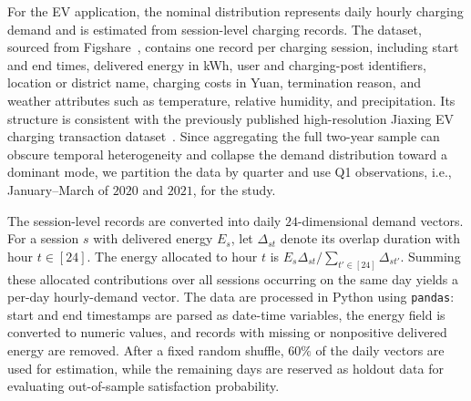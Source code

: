 \documentclass[opre,sglanonrev]{informs4}
\newcommand{\bw}{\bm{w}}
\begin{document}
{\begin{APPENDICES}
For the EV application, the nominal distribution represents daily hourly charging demand and is estimated from session-level charging records. The dataset, sourced from Figshare~\cite{evcharging2025figshare}, contains one record per charging session, including start and end times, delivered energy in kWh, user and charging-post identifiers, location or district name, charging costs in Yuan, termination reason, and weather attributes such as temperature, relative humidity, and precipitation. Its structure is consistent with the previously published high-resolution Jiaxing EV charging transaction dataset~\cite{evcharging2025nature}. Since aggregating the full two-year sample can obscure temporal heterogeneity and collapse the demand distribution toward a dominant mode, we partition the data by quarter and use Q1 observations, i.e., January--March of \(2020\) and \(2021\), for the study.

The session-level records are converted into daily \(24\)-dimensional demand vectors. For a session \(s\) with delivered energy \(E_s\), let \(\Delta_{st}\) denote its overlap duration with hour \(t\in[24]\). The energy allocated to hour \(t\) is \(E_s\Delta_{st}/\sum_{t'\in[24]}\Delta_{st'}\). Summing these allocated contributions over all sessions occurring on the same day yields a per-day hourly-demand vector. The data are processed in Python using \texttt{pandas}: start and end timestamps are parsed as date-time variables, the energy field is converted to numeric values, and records with missing or nonpositive delivered energy are removed. After a fixed random shuffle, \(60\%\) of the daily vectors are used for estimation, while the remaining days are reserved as holdout data for evaluating out-of-sample satisfaction probability.

 
 


\end{APPENDICES}}
\end{document}
